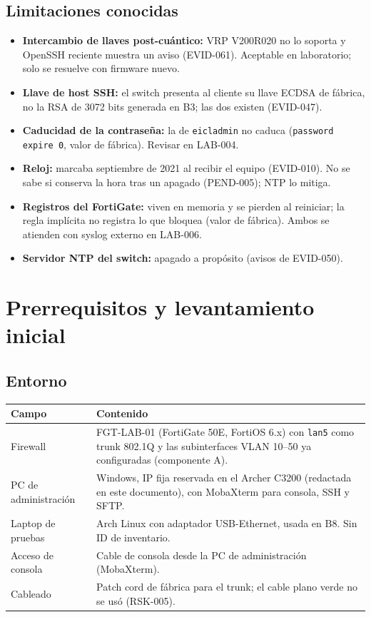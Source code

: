 \documentclass[11pt,a4paper]{article}
\newcommand{\cab}{\rowcolor{light}}
\begin{document}
\subsection{Limitaciones conocidas}
\begin{itemize}
  \item \textbf{Intercambio de llaves post-cuántico:} VRP V200R020 no lo soporta y OpenSSH reciente muestra un aviso (EVID-061). Aceptable en laboratorio; solo se resuelve con firmware nuevo.
  \item \textbf{Llave de host SSH:} el switch presenta al cliente su llave ECDSA de fábrica, no la RSA de 3072 bits generada en B3; las dos existen (EVID-047).
  \item \textbf{Caducidad de la contraseña:} la de \texttt{eicladmin} no caduca (\texttt{password expire 0}, valor de fábrica). Revisar en LAB-004.
  \item \textbf{Reloj:} marcaba septiembre de 2021 al recibir el equipo (EVID-010). No se sabe si conserva la hora tras un apagado (PEND-005); NTP lo mitiga.
  \item \textbf{Registros del FortiGate:} viven en memoria y se pierden al reiniciar; la regla implícita no registra lo que bloquea (valor de fábrica). Ambos se atienden con syslog externo en LAB-006.
  \item \textbf{Servidor NTP del switch:} apagado a propósito (avisos de EVID-050).
\end{itemize}

\section{Prerrequisitos y levantamiento inicial}
\subsection{Entorno}
\begin{tabularx}{\textwidth}{L{3.8cm} Z}
  \toprule
  \cab\textbf{Campo} & \textbf{Contenido}\\
  \midrule
  Firewall & FGT-LAB-01 (FortiGate 50E, FortiOS 6.x) con \texttt{lan5} como trunk 802.1Q y las subinterfaces VLAN 10--50 ya configuradas (componente A).\\
  PC de administración & Windows, IP fija reservada en el Archer C3200 (redactada en este documento), con MobaXterm para consola, SSH y SFTP.\\
  Laptop de pruebas & Arch Linux con adaptador USB-Ethernet, usada en B8. Sin ID de inventario.\\
  Acceso de consola & Cable de consola desde la PC de administración (MobaXterm).\\
  Cableado & Patch cord de fábrica para el trunk; el cable plano verde no se usó (RSK-005).\\
  \bottomrule
\end{tabularx}
\end{document}
